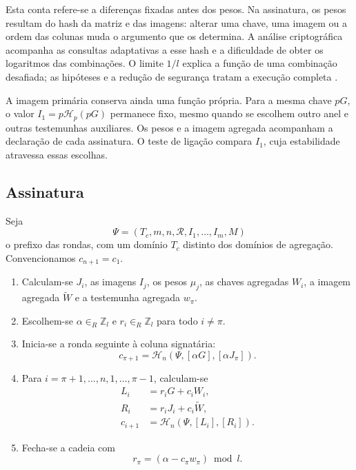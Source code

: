Esta conta refere-se a diferenças fixadas antes dos pesos. Na
assinatura, os pesos resultam do hash da matriz e das imagens: alterar
uma chave, uma imagem ou a ordem das colunas muda o argumento que
os determina. A análise criptográfica acompanha as consultas
adaptativas a esse hash e a dificuldade de obter os logaritmos das
combinações. O limite \(1/l\) explica a função de uma combinação
desafiada; as hipóteses e a redução de segurança tratam a execução
completa \cite{MRL-0011-CLSAG}.

A imagem primária conserva ainda uma função própria. Para a mesma
chave \(pG\), o valor \(I_1=p\mathcal H_p(pG)\) permanece fixo,
mesmo quando se escolhem outro anel e outras testemunhas auxiliares.
Os pesos e a imagem agregada acompanham a declaração de cada
assinatura. O teste de ligação compara \(I_1\), cuja estabilidade
atravessa essas escolhas.

\subsection*{Assinatura}

Seja
\[
\Psi=(T_c,m,n,\mathcal R,I_1,\ldots,I_m,M)
\]
o prefixo das rondas, com um domínio \(T_c\) distinto dos domínios de
agregação. Convencionamos \(c_{n+1}=c_1\).

\begin{enumerate}
    \item Calculam-se \(J_i\), as imagens \(I_j\), os pesos \(\mu_j\), as
    chaves agregadas \(W_i\), a imagem agregada \(\widetilde W\) e a
    testemunha agregada \(w_\pi\).

    \item Escolhem-se \(\alpha\in_R\mathbb Z_l\) e
    \(r_i\in_R\mathbb Z_l\) para todo \(i\neq\pi\).

    \item Inicia-se a ronda seguinte à coluna signatária:
    \[
    c_{\pi+1}
      =\mathcal H_n(\Psi,[\alpha G],[\alpha J_\pi]).
    \]

    \item Para
    \(i=\pi+1,\ldots,n,1,\ldots,\pi-1\), calculam-se
    \begin{align*}
    L_i&=r_iG+c_iW_i,\\
    R_i&=r_iJ_i+c_i\widetilde W,\\
    c_{i+1}&=\mathcal H_n(\Psi,[L_i],[R_i]).
    \end{align*}

    \item Fecha-se a cadeia com
    \[
    r_\pi=(\alpha-c_\pi w_\pi)\bmod l.
    \]
\end{enumerate}

